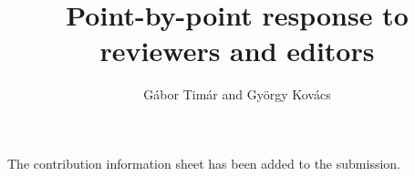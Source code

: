 \documentclass{article}
\title{Point-by-point response to reviewers and editors}
\author{G\'abor Tim\'ar and Gy\"orgy Kov\'acs}
\begin{document}
\maketitle


The contribution information sheet has been added to the submission.
\end{document}
